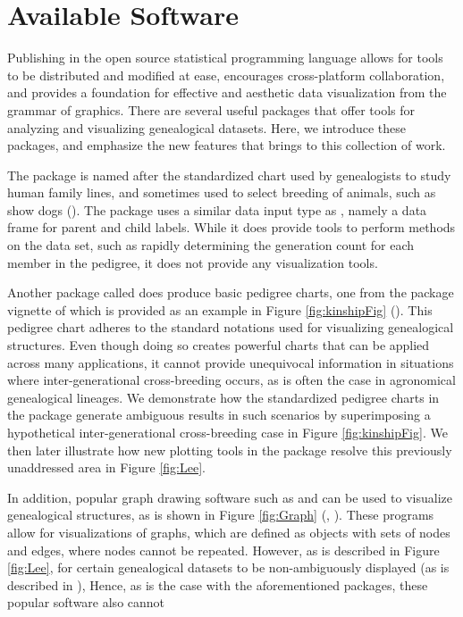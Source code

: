 \documentclass[article,shortnames]{jss}
\begin{document}
\section{Available Software}

Publishing in the open source  statistical programming language allows for tools to be distributed and modified at ease, encourages cross-platform collaboration, and provides a foundation for effective and aesthetic data visualization from the grammar of graphics. There are several useful  packages that offer tools for analyzing and visualizing genealogical datasets. Here, we introduce these packages, and emphasize the new features that  brings to this collection of work.

The  package  is named after the standardized chart used by genealogists to study human family lines, and sometimes used to select breeding of animals, such as show dogs (\citealt{ped}). The package uses a similar data input type as , namely a data frame for parent and child labels. While it does provide tools to perform methods on the data set, such as rapidly determining the generation count for each member in the pedigree, it does not provide any visualization tools.

Another  package called  does produce basic pedigree charts, one from the package vignette of which is provided as an example in Figure \ref{fig:kinshipFig} (\citealt{kin}). This pedigree chart adheres to the standard notations used for visualizing genealogical structures. Even though doing so creates powerful charts that can be applied across many applications, it cannot provide unequivocal information in situations where inter-generational cross-breeding occurs, as is often the case in agronomical genealogical lineages. We demonstrate how the standardized pedigree charts in the  package generate ambiguous results in such scenarios by superimposing a hypothetical inter-generational cross-breeding case in Figure \ref{fig:kinshipFig}. We then later illustrate how new plotting tools in the  package resolve this previously unaddressed area in Figure \ref{fig:Lee}.

In addition, popular graph drawing software such as  and  can be used to visualize genealogical structures, as is shown in Figure \ref{fig:Graph} (\citealt{graphvizCit}, \citealt{cytoscapeCit}). These programs allow for visualizations of graphs, which are defined as objects with sets of nodes and edges, where nodes cannot be repeated. However, as is described in Figure \ref{fig:Lee}, for certain genealogical datasets to be non-ambiguously displayed (as is described in ), Hence, as is the case with the aforementioned  packages, these popular software also cannot
\end{document}
